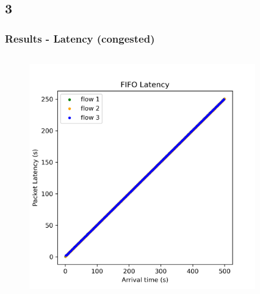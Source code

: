 \documentclass[compress]{beamer}
\begin{document}
    \subsection{3}
    \begin{frame}
        \frametitle{Results - Latency (congested)}
        \begin{columns}
            \begin{column}{0.5\textwidth}
                \begin{figure}
                    \centering
                    \includegraphics[width=\textwidth]{../img/FIFO_Latency}
                \end{figure}
            \end{column}
            \begin{column}{0.5\textwidth}
                \begin{figure}
                    \centering

\end{figure}
\end{column}
\end{columns}
\end{frame}
\end{document}
